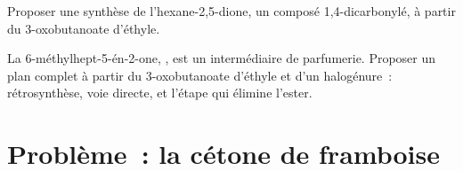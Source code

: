 \begin{exercise}[$\star\star\star$]\label{exo:b2:retrosynthesis:11}
Proposer une synthèse de l'hexane-2,5-dione, un composé 1,4-dicarbonylé, à partir du 3-oxobutanoate d'éthyle.
\end{exercise}

\begin{exercise}[$\star\star\star$]\label{exo:b2:retrosynthesis:12}
La 6-méthylhept-5-én-2-one, , est un intermédiaire de parfumerie. Proposer un
plan complet à partir du 3-oxobutanoate d'éthyle et d'un halogénure~: rétrosynthèse, voie directe, et
l'étape qui élimine l'ester.
\end{exercise}

\section{Problème~: la cétone de framboise}

